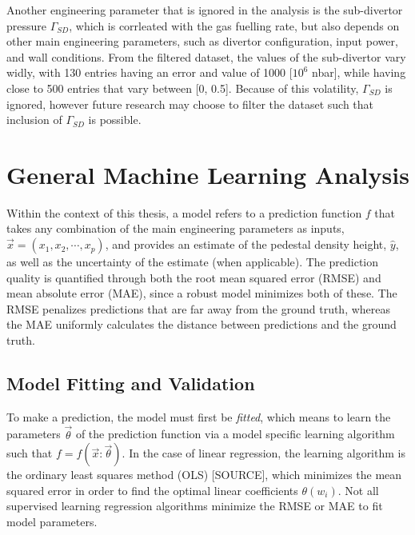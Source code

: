 \documentclass[a4paper, twoside, final, 12pt]{article}
\begin{document}
Another engineering parameter that is ignored in the analysis is the sub-divertor pressure $\Gamma_{SD}$, which is corrleated with the gas fuelling rate, but also depends on other main engineering parameters, such as divertor configuration, input power, and wall conditions.
From the filtered dataset, the values of the sub-divertor vary widly, with 130 entries having an error and value of 1000 [$10^6$ nbar], while having close to 500 entries that vary between [0, 0.5].
Because of this volatility, $\Gamma_{SD}$ is ignored, however future research may choose to filter the dataset such that inclusion of $\Gamma_{SD}$ is possible.



\section{General Machine Learning Analysis}\label{sec:principle-machine-learning-analysis}
Within the context of this thesis, a model refers to a prediction function $f$ that takes any combination of the main engineering parameters as inputs, $\vec{x} = (x_1, x_2, \cdots, x_p)$,  and provides an estimate of the pedestal density height, $\hat{y}$, as well as the uncertainty of the estimate (when applicable).
The prediction quality is quantified through both the root mean squared error (RMSE) and mean absolute error (MAE), since a robust model minimizes both of these.
The RMSE penalizes predictions that are far away from the ground truth, whereas the MAE uniformly calculates the distance between predictions and the ground truth.

\subsection{Model Fitting and Validation}
To make a prediction, the model must first be \textit{fitted}, which means to learn the parameters $\vec{\theta}$ of the prediction function via a model specific learning algorithm such that $f = f(\vec{x}: \vec{\theta})$.
In the case of linear regression, the learning algorithm is the ordinary least squares method (OLS) [SOURCE], which minimizes the mean squared error in order to find the optimal linear coefficients $\theta(w_i)$.
Not all supervised learning regression algorithms minimize the RMSE or MAE to fit model parameters. 
\end{document}
